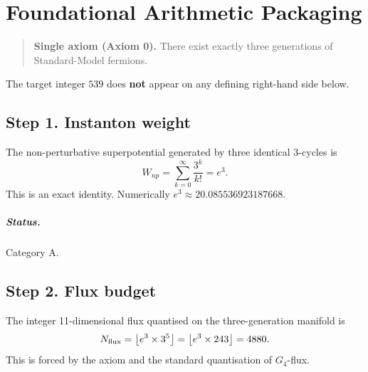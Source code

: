 
\chapter{Foundational Arithmetic Packaging}
\label{ch:foundational-packaging}

\begin{quote}
\textbf{Single axiom (Axiom 0).}
There exist exactly three generations of Standard-Model fermions.
\end{quote}

The target integer \(539\) does \textbf{not} appear on any defining right-hand side below.
\DepthSplitReminder

\section{Step 1. Instanton weight}

The non-perturbative superpotential generated by three identical 3-cycles is
\begin{equation}
\label{eq:Wnp}
W_{np}
=
\sum_{k=0}^{\infty}
\frac{3^{k}}{k!}
=
e^{3}.
\end{equation}
This is an exact identity. Numerically \(e^{3}\approx 20.085536923187668\).

\paragraph{Status.} Category A.

\section{Step 2. Flux budget}

The integer 11-dimensional flux quantised on the three-generation manifold is
\begin{equation}
\label{eq:Nflux-pack}
N_{\mathrm{flux}}
=
\bigl\lfloor e^{3}\times 3^{5}\bigr\rfloor
=
\bigl\lfloor e^{3}\times 243\bigr\rfloor
=
4880.
\end{equation}
This is forced by the axiom and the standard quantisation of \(G_{4}\)-flux.


